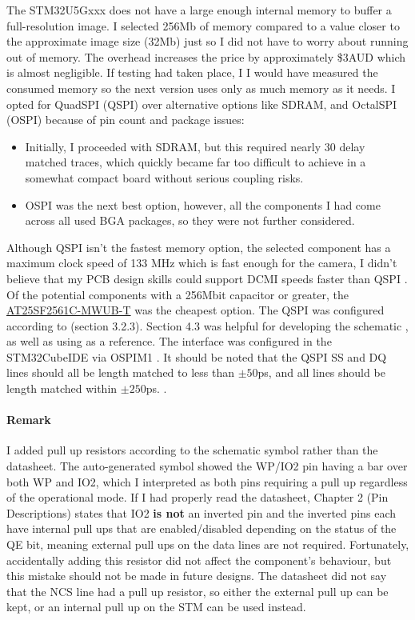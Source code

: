 The STM32U5Gxxx does not have a large enough internal memory to buffer a full-resolution image. I selected 256Mb of memory compared to a value closer to the approximate image size (32Mb) just so I did not have to worry about running out of memory. The overhead increases the price by approximately \$3AUD which is almost negligible. If testing had taken place, I I would have measured the consumed memory so the next version uses only as much memory as it needs.
\nl
I opted for QuadSPI (QSPI) over alternative options like SDRAM, and OctalSPI (OSPI) because of pin count and package issues:
\begin{itemize}
    \item Initially, I proceeded with SDRAM, but this required nearly 30 delay matched traces, which quickly became far too difficult to achieve in a somewhat compact board without serious coupling risks.
    \item OSPI was the next best option, however, all the components I had come across all used BGA packages, so they were not further considered.
\end{itemize}
Although QSPI isn't the fastest memory option, the selected component has a maximum clock speed of 133 MHz which is fast enough for the camera, I didn't believe that my PCB design skills could support DCMI speeds faster than QSPI \cite{stm-dcmi}.
\nl
Of the potential components with a 256Mbit capacitor or greater, the \href{https://www.renesas.com/en/products/at25sf2561c/part-details/at25sf2561c-mwub-t}{AT25SF2561C-MWUB-T} was the cheapest option.
\nl
The QSPI was configured according to \cite{qspi-interface} (section 3.2.3). Section 4.3 was helpful for developing the schematic \cite{qspi-interface}, as well as using \cite{qspi-reference-schematic} as a reference. The interface was configured in the STM32CubeIDE via OSPIM1 \cite{ST_forum_u5g9vjtxq_quadspi} \cite{ST_wiki_XSPI_interoperability}.
It should be noted that the QSPI SS and DQ lines should all be length matched to less than $\pm50$ps, and all lines should be length matched within $\pm250$ps. \cite{QSPI-length-match} \cite{high-speed-layout}.

\paragraph{Remark}\label{sec:v0.1-memory-remark}
I added pull up resistors according to the schematic symbol rather than the datasheet. The auto-generated symbol showed the WP/IO2 pin having a bar over both WP and IO2, which I interpreted as both pins requiring a pull up regardless of the operational mode. If I had properly read the datasheet, Chapter 2 (Pin Descriptions) states that IO2 \textbf{is not} an inverted pin and the inverted pins each have internal pull ups that are enabled/disabled depending on the status of the QE bit, meaning external pull ups on the data lines are not required. Fortunately, accidentally adding this resistor did not affect the component's behaviour, but this mistake should not be made in future designs. The datasheet did not say that the NCS line had a pull up resistor, so either the external pull up can be kept, or an internal pull up on the STM can be used instead.